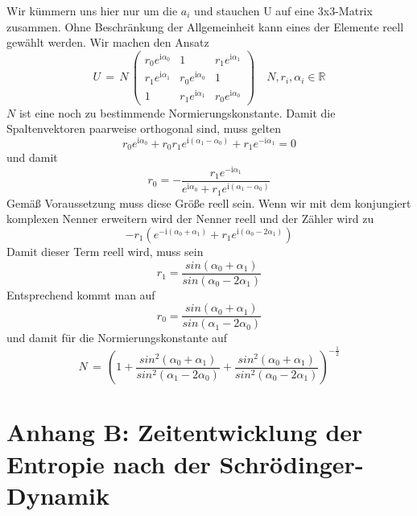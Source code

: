 \documentclass[12pt]{article}
\begin{document}
Wir kümmern uns hier nur um die $a_i$ und stauchen U auf eine 3x3-Matrix zusammen. Ohne Beschränkung der Allgemeinheit kann eines der Elemente reell gewählt werden. Wir machen den Ansatz
\begin{equation*}
U\, =\, N \, 
\begin{pmatrix}
r_0 e^{\mathrm i\alpha_0} & 1 & r_1 e^{\mathrm i\alpha_1} \\
r_1 e^{\mathrm i\alpha_1} & r_0 e^{\mathrm i\alpha_0} & 1 \\
1 & r_1 e^{\mathrm i\alpha_1} & r_0 e^{\mathrm i\alpha_0}
\end{pmatrix}
\quad N, r_i, \alpha_i \in \mathbb{R}
\end{equation*}
$N$ ist eine noch zu bestimmende Normierungskonstante. Damit die Spaltenvektoren paarweise orthogonal sind, muss gelten
\begin{equation*}
r_0 e^{\mathrm  i\alpha_0} + r_0 r_1 e^{\mathrm i(\alpha_1 - \alpha_0)} + r_1 e^{- \mathrm  i\alpha_1} = 0
\end{equation*}
und damit 
\begin{equation*}
r_0 = - \frac{r_1 e^{-\mathrm i\alpha_1}}{ e^{\mathrm i\alpha_0} + r_1 e^{\mathrm i(\alpha_1 - \alpha_0)} }
\end{equation*}
Gemäß Voraussetzung muss diese Größe reell sein. Wenn wir mit dem konjungiert komplexen Nenner erweitern wird der Nenner reell und der Zähler wird zu
\begin{equation*}
-r_1 \left( e^{-\mathrm i(\alpha_0+\alpha_1)} + r_1 e^{\mathrm i(\alpha_0-2\alpha_1)} \right)
\end{equation*}
Damit dieser Term reell wird, muss sein
\begin{equation*}
r_1=\frac{sin(\alpha_0+\alpha_1)}{sin(\alpha_0-2\alpha_1)}
\end{equation*}
Entsprechend kommt man auf 
\begin{equation*}
r_0=\frac{sin(\alpha_0+\alpha_1)}{sin(\alpha_1-2\alpha_0)}
\end{equation*}
und damit für die Normierungskonstante auf 
\begin{equation*}
N\, = \, \left( 1 +
\frac{sin^2(\alpha_0+\alpha_1)}{sin^2(\alpha_1-2\alpha_0)} +
\frac{sin^2(\alpha_0+\alpha_1)}{sin^2(\alpha_0-2\alpha_1)} \right)^{-\frac{1}{2}}
\end{equation*}

\section{Anhang B: Zeitentwicklung der Entropie nach der Schrödinger-Dynamik}
\end{document}
